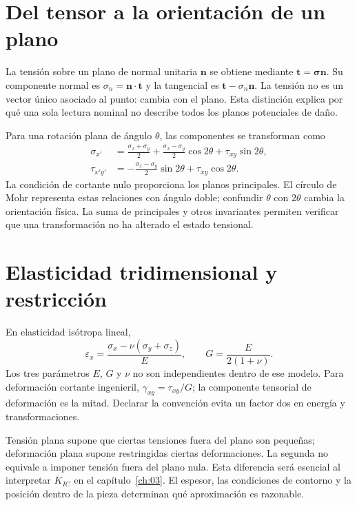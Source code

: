 
\section{Del tensor a la orientación de un plano}
La tensión sobre un plano de normal unitaria $\mathbf n$ se obtiene mediante $\mathbf t=\boldsymbol\sigma\mathbf n$. Su componente normal es $\sigma_n=\mathbf n\cdot\mathbf t$ y la tangencial es $\mathbf t-\sigma_n\mathbf n$. La tensión no es un vector único asociado al punto: cambia con el plano. Esta distinción explica por qué una sola lectura nominal no describe todos los planos potenciales de daño.

Para una rotación plana de ángulo $\theta$, las componentes se transforman como
\begin{align}
\sigma_{x'}&=\frac{\sigma_x+\sigma_y}{2}+\frac{\sigma_x-\sigma_y}{2}\cos2\theta+\tau_{xy}\sin2\theta,\\
\tau_{x'y'}&=-\frac{\sigma_x-\sigma_y}{2}\sin2\theta+\tau_{xy}\cos2\theta.
\end{align}
La condición de cortante nulo proporciona los planos principales. El círculo de Mohr representa estas relaciones con ángulo doble; confundir $\theta$ con $2\theta$ cambia la orientación física. La suma de principales y otros invariantes permiten verificar que una transformación no ha alterado el estado tensional.
\section{Elasticidad tridimensional y restricción}
En elasticidad isótropa lineal,
\begin{equation}\varepsilon_x=\frac{\sigma_x-\nu(\sigma_y+\sigma_z)}{E},\qquad G=\frac{E}{2(1+\nu)}.\end{equation}
Los tres parámetros $E$, $G$ y $\nu$ no son independientes dentro de ese modelo. Para deformación cortante ingenieril, $\gamma_{xy}=\tau_{xy}/G$; la componente tensorial de deformación es la mitad. Declarar la convención evita un factor dos en energía y transformaciones.

Tensión plana supone que ciertas tensiones fuera del plano son pequeñas; deformación plana supone restringidas ciertas deformaciones. La segunda no equivale a imponer tensión fuera del plano nula. Esta diferencia será esencial al interpretar $K_{IC}$ en el capítulo~\ref{ch:03}. El espesor, las condiciones de contorno y la posición dentro de la pieza determinan qué aproximación es razonable.
